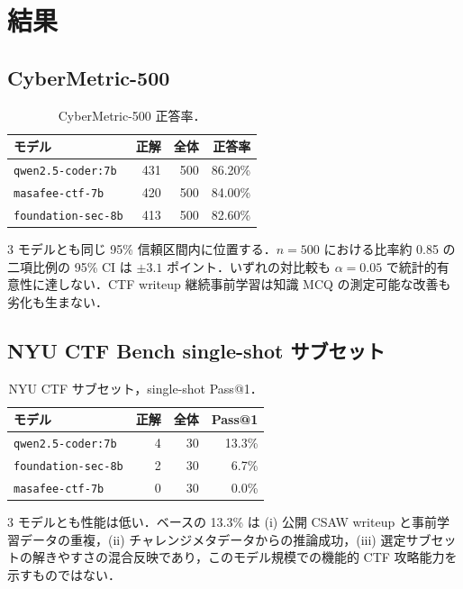 \documentclass[10pt,twocolumn,a4paper]{ltjsarticle}
\begin{document}
\section{結果}

\subsection{CyberMetric-500}

\begin{table}[h!]
\centering
\caption{CyberMetric-500 正答率．}
\label{tab:cybermetric}
\small
\begin{tabular}{lrrr}
\toprule
モデル & 正解 & 全体 & 正答率 \\
\midrule
\texttt{qwen2.5-coder:7b} & 431 & 500 & 86.20\% \\
\texttt{masafee-ctf-7b} & 420 & 500 & 84.00\% \\
\texttt{foundation-sec-8b} & 413 & 500 & 82.60\% \\
\bottomrule
\end{tabular}
\end{table}

3 モデルとも同じ 95\% 信頼区間内に位置する．$n=500$ における比率約 0.85 の二項比例の 95\% CI は $\pm 3.1$ ポイント．いずれの対比較も $\alpha = 0.05$ で統計的有意性に達しない．CTF writeup 継続事前学習は知識 MCQ の測定可能な改善も劣化も生まない．

\subsection{NYU CTF Bench single-shot サブセット}

\begin{table}[h!]
\centering
\caption{NYU CTF サブセット，single-shot Pass@1．}
\label{tab:nyu}
\small
\begin{tabular}{lrrr}
\toprule
モデル & 正解 & 全体 & Pass@1 \\
\midrule
\texttt{qwen2.5-coder:7b} & 4 & 30 & 13.3\% \\
\texttt{foundation-sec-8b} & 2 & 30 & 6.7\% \\
\texttt{masafee-ctf-7b} & 0 & 30 & 0.0\% \\
\bottomrule
\end{tabular}
\end{table}

3 モデルとも性能は低い．ベースの 13.3\% は (i) 公開 CSAW writeup と事前学習データの重複，(ii) チャレンジメタデータからの推論成功，(iii) 選定サブセットの解きやすさの混合反映であり，このモデル規模での機能的 CTF 攻略能力を示すものではない．
\end{document}
